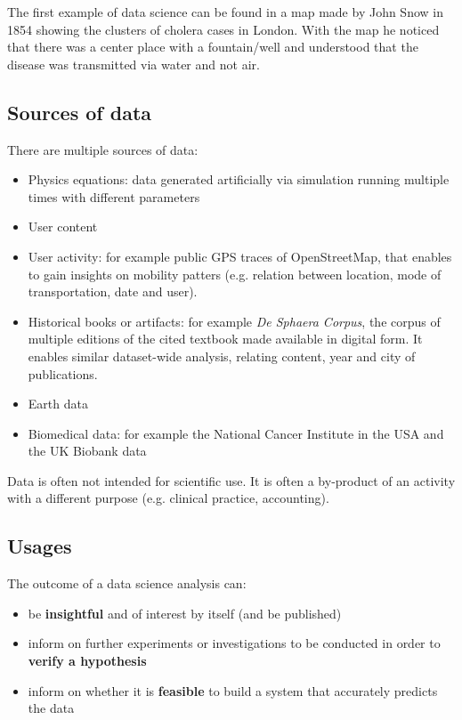 The first example of data science can be found in a map made by John Snow in 1854 showing the clusters of cholera cases in London. With the map he noticed that there was a center place with a fountain/well and understood that the disease was transmitted via water and not air.

\subsection{Sources of data}
There are multiple sources of data:
\begin{itemize}
	\item Physics equations: data generated artificially via simulation running multiple times with different parameters
	\item User content
	\item User activity: for example public GPS traces of OpenStreetMap, that enables to gain insights on mobility patters (e.g. relation between location, mode of transportation, date and user).
	\item Historical books or artifacts: for example \textit{De Sphaera Corpus}, the corpus of multiple editions of the cited textbook made available in digital form. It enables similar dataset-wide analysis, relating content, year and city of publications.
	\item Earth data
	\item Biomedical data: for example the National Cancer Institute in the USA and the UK Biobank data
\end{itemize}
\begin{note}
	Data is often not intended for scientific use. It is often a by-product of an activity with a different purpose (e.g. clinical practice, accounting).
\end{note}

\subsection{Usages}
The outcome of a data science analysis can:
\begin{itemize}
	\item be \textbf{insightful} and of interest by itself (and be published)
	\item inform on further experiments or investigations to be conducted in order to \textbf{verify a hypothesis}
	\item inform on whether it is \textbf{feasible} to build a system that accurately predicts the data
\end{itemize}

